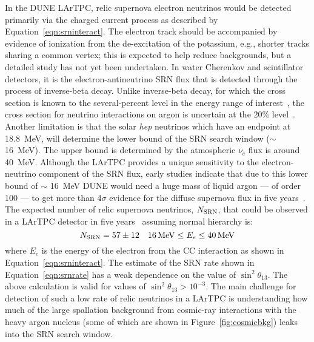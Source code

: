 In the DUNE LArTPC, relic supernova electron neutrinos would be
detected primarily via the charged current process as described by
Equation~\ref{eqn:srninteract}. The electron track should be
accompanied by evidence of ionization from the de-excitation of the
potassium, e.g., shorter tracks sharing a common vertex; this is
expected to help reduce backgrounds, but a detailed study has not yet
been undertaken.  In water Cherenkov and scintillator detectors, it is
the electron-antineutrino SRN flux that is detected through the
process of inverse-beta decay.  Unlike inverse-beta decay, for which
the cross section is known to the several-percent level in the energy
range of interest~\cite{Vogel:1999zy,Strumia:2003zx}, the cross
section for neutrino interactions on argon is uncertain at the 20\%
level~\cite{Ormand:1994js,Kolbe:2003ys,SajjadAthar:2004yf}. Another
limitation is that the solar {\em hep} neutrinos which have an                
endpoint at \SI{18.8}{\MeV}, will determine the lower bound of the SRN
search window ($\sim$ \SI{16}{\MeV}).  The upper bound is determined
by the atmospheric ${\nu}_{e}$ flux 
is around \SI{40}{MeV}.
Although the LArTPC provides a unique sensitivity to the
electron-neutrino component of the SRN flux, early studies indicate
that due to this lower bound of $\sim$ \SI{16}{\MeV} DUNE would need a huge
mass of liquid argon --- of order \SI{100}{\kt} --- to get more than 4$\sigma$
evidence for the diffuse supernova flux in five
years~\cite{Cocco:2004ac}.
%
The expected number of relic
supernova neutrinos, $N_{\rm SRN}$, that could be observed in a
 LArTPC detector in five years~\cite{Cocco:2004ac}
assuming normal hierarchy is:
\begin{equation}
N_{\rm SRN} = 57 \pm 12  \ \ \ 16 \, {\rm MeV} \leq E_e \leq 40 \, {\rm MeV}
\label{eqn:srnrate}
\end{equation}
where $E_e$ is the energy of the electron from the CC interaction as
shown in Equation~\ref{eqn:srninteract}. The estimate of the SRN rate
shown in Equation~\ref{eqn:srnrate} has a weak dependence on the value
of $\sin ^2 \theta_{13}$. The above calculation is valid for values of
$\sin ^2 \theta_{13} > 10^{-3}$.  The main challenge for detection of such
a low rate of relic neutrinos in a LArTPC is understanding how much of
the large spallation background from cosmic-ray interactions with the
heavy argon nucleus (some of which are shown in Figure~\ref{fig:cosmicbkg}) leaks into the SRN search window. 

